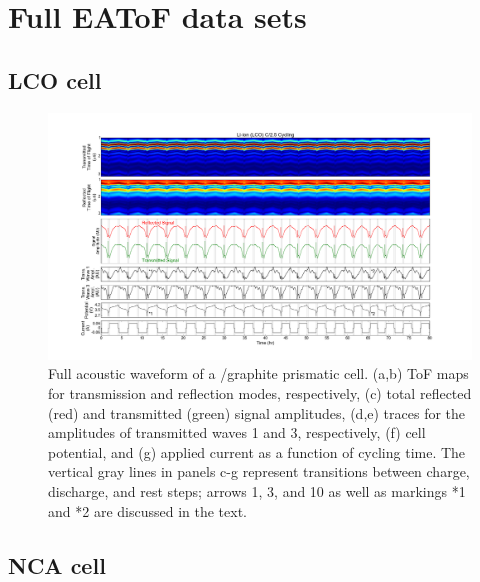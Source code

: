 \chapter{Full EAToF data sets\label{ch:fulldata}}

\section{LCO cell}

\begin{figure}[htb]
  \centering
    \includegraphics[width=\textwidth]{ch-appendices/images/lcofull.png}
    \caption[Full acoustic waveform of a /graphite prismatic cell.]{Full acoustic waveform of a /graphite prismatic cell. (a,b) ToF maps for transmission and reflection modes, respectively, (c) total reflected (red) and transmitted (green) signal amplitudes, (d,e) traces for the amplitudes of transmitted waves 1 and 3, respectively, (f) cell potential, and (g) applied current as a function of cycling time. The vertical gray lines in panels c-g represent transitions between charge, discharge, and rest steps; arrows 1, 3, and 10 as well as markings *1 and *2 are discussed in the text.}
    \label{fig:lcofull}
\end{figure} 

\section{NCA cell}

